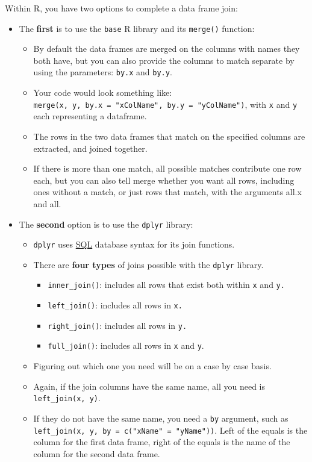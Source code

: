 \documentclass[
]{book}
\providecommand{\tightlist}{%
  \setlength{\itemsep}{0pt}\setlength{\parskip}{0pt}}
\begin{document}
Within R, you have two options to complete a data frame join:

\begin{itemize}
\tightlist
\item
  The \textbf{first} is to use the \texttt{base} R library and its \texttt{merge()} function:

  \begin{itemize}
  \tightlist
  \item
    By default the data frames are merged on the columns with names they both have, but you can also provide the columns to match separate by using the parameters: \texttt{by.x} and \texttt{by.y}.
  \item
    Your code would look something like: \texttt{merge(x,\ y,\ by.x\ =\ "xColName",\ by.y\ =\ "yColName")}, with \texttt{x} and \texttt{y} each representing a dataframe.
  \item
    The rows in the two data frames that match on the specified columns are extracted, and joined together.
  \item
    If there is more than one match, all possible matches contribute one row each, but you can also tell merge whether you want all rows, including ones without a match, or just rows that match, with the arguments all.x and all.
  \end{itemize}
\item
  The \textbf{second} option is to use the \texttt{dplyr} library:

  \begin{itemize}
  \tightlist
  \item
    \texttt{dplyr} uses \href{https://en.wikipedia.org/wiki/SQL}{SQL} database syntax for its join functions.
  \item
    There are \textbf{four types} of joins possible with the \texttt{dplyr} library.

    \begin{itemize}
    \tightlist
    \item
      \texttt{inner\_join()}: includes all rows that exist both within \texttt{x} and \texttt{y.}
    \item
      \texttt{left\_join()}: includes all rows in \texttt{x.}
    \item
      \texttt{right\_join()}: includes all rows in \texttt{y.}
    \item
      \texttt{full\_join()}: includes all rows in \texttt{x} and \texttt{y}.
    \end{itemize}
  \item
    Figuring out which one you need will be on a case by case basis.
  \item
    Again, if the join columns have the same name, all you need is \texttt{left\_join(x,\ y)}.
  \item
    If they do not have the same name, you need a \texttt{by} argument, such as \texttt{left\_join(x,\ y,\ by\ =\ c("xName"\ =\ "yName"))}. Left of the equals is the column for the first data frame, right of the equals is the name of the column for the second data frame.
  \end{itemize}
\end{itemize}
\end{document}
